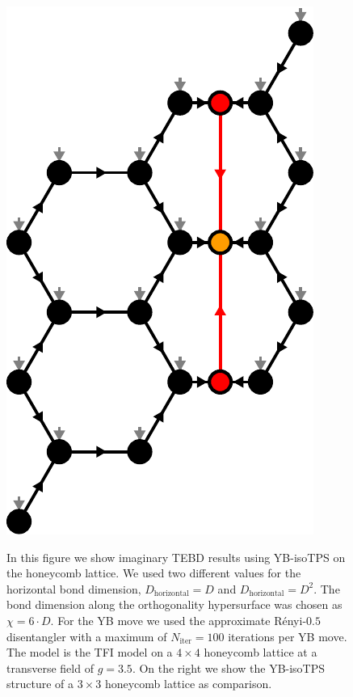 \begin{figure}
\begin{minipage}{1.0\textwidth}
%
		\quad\quad
		\raisebox{15pt}
		{%
			\includegraphics[scale=0.5]{figures/tikz/TFI/hexagonal_lattice/hexagonal_lattice_structure.pdf}
		}
	\end{minipage}
	\caption{In this figure we show imaginary TEBD results using YB-isoTPS on the honeycomb lattice. We used two different values for the horizontal bond dimension, $D_\text{horizontal} = D$ and $D_\text{horizontal} = D^2$. The bond dimension along the orthogonality hypersurface was chosen as $\chi = 6\cdot D$. For the YB move we used the approximate Rényi-$0.5$ disentangler with a maximum of $N_\text{iter} = 100$ iterations per YB move. The model is the TFI model on a $4\times 4$ honeycomb lattice at a transverse field of $g = 3.5$. On the right we show the YB-isoTPS structure of a $3\times 3$ honeycomb lattice as comparison.}
	\label{fig:tfi_gs_energy_vs_dtau_honeycomb}
\end{figure}